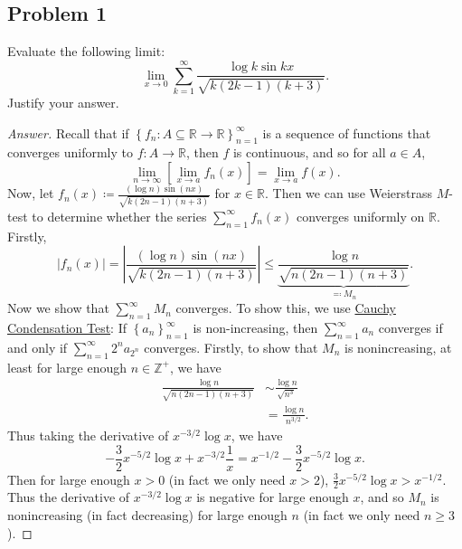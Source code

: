 \documentclass[12pt]{article}
\newcommand{\z}{\mathbb{Z}}
\newcommand{\real}{\mathbb{R}}
\newcommand\setb[1]{\left \{ #1 \right \}}
\newcommand{\sqbrack}[1]{\left [ #1 \right ]}
\newcommand{\abs}[1]{\left | #1 \right |}
\theoremstyle{definition}
\begin{document}
\subsection{Problem 1 \texorpdfstring{\cite{Bartle,Christian,Joel}}{}}
Evaluate the following limit:
\[
    \lim\limits_{x \to 0} \sum\limits_{k = 1}^{\infty} \frac{\log k \sin kx}{\sqrt{k(2k-1)(k+3)}}.
\]
Justify your answer.
\begin{proof}[Answer]
    Recall that if $\setb{ f_n : A \subseteq \real \to \real }_{n=1}^{\infty}$ is a sequence of functions that converges uniformly to $f : A \to \real$, then $f$ is continuous, and so for all $a \in A$, 
    \[
        \lim\limits_{n \to \infty} \sqbrack{ \lim\limits_{x \to a} f_n(x) } = \lim\limits_{x \to a} f(x).
    \]
    Now, let $f_n(x) \coloneqq \frac{(\log n) \sin (nx)}{\sqrt{k(2n-1)(n+3)}}$ for $x \in \real$. Then we can use Weierstrass $M$-test to determine whether the series $\sum\limits_{n = 1}^{\infty} f_n(x)$ converges uniformly on $\real$. Firstly, 
    \[
        \abs{ f_n(x) } = \abs{ \frac{(\log n) \sin( nx)}{\sqrt{k(2n-1)(n+3)}} } \leq \underbrace{ \frac{\log n}{\sqrt{n(2n-1)(n+3)}} }_{ \eqqcolon M_n}.
    \]
    Now we show that $\sum\limits_{n = 1}^{\infty} M_n$ converges. To show this, we use \underline{Cauchy Condensation Test}: If $\setb{ a_n }_{n=1}^{\infty}$ is non-increasing, then $\sum\limits_{n = 1}^{\infty} a_n$ converges if and only if $\sum\limits_{n = 1}^{\infty} 2^n a_{2^n}$ converges. Firstly, to show that $M_n$ is nonincreasing, at least for large enough $n \in \z^+$, we have
    \begin{align*}
        \frac{\log n}{\sqrt{n(2n-1)(n+3)}} & \sim \frac{\log n}{\sqrt{n^3}} \\
        & = \frac{\log n}{n^{3/2}}.
    \end{align*}
    Thus taking the derivative of $x^{-3/2}\log x$, we have
    \[
        -\frac{3}{2} x^{-5/2} \log x + x^{-3/2} \frac{1}{x} = x^{-1/2} - \frac{3}{2} x^{-5/2} \log x.
    \]
    Then for large enough $x > 0$ (in fact we only need $x > 2$), $\frac{3}{2} x^{-5/2} \log x > x^{-1/2}$. Thus the derivative of $x^{-3/2}\log x$ is negative for large enough $x$, and so $M_n$ is nonincreasing (in fact decreasing) for large enough $n$ (in fact we only need $n \geq 3$).
    

\end{proof}
\end{document}
